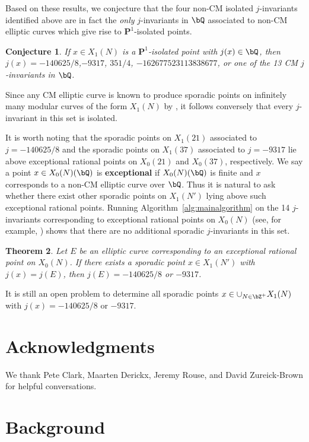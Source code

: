 \documentclass[11pt,reqno]{amsart}
\theoremstyle{plain}
\newtheorem{theorem}{Theorem}%
\newtheorem{conjecture}[theorem]{Conjecture}
\theoremstyle{definition}
\newcommand{\Q}{\bQ}
\newcommand{\Z}{\bZ}
\newcommand{\PP}{\mathbf P}
\begin{document}
Based on these results, we conjecture that the four non-CM isolated $j$-invariants identified above are in fact the \emph{only} $j$-invariants in $\Q$ associated to non-CM elliptic curves which give rise to $\PP^1$-isolated points.

\begin{conjecture}
If $x\in X_1(N)$ is a $\PP^1$-isolated point with $j(x) \in \Q$, then $j(x)=-140625/8$,$-9317$, $351/4$, $-162677523113838677$, or one of the 13 CM $j$-invariants in $\Q$.
\end{conjecture}

\noindent Since any CM elliptic curve is known to produce sporadic points on infinitely many modular curves of the form $X_1(N)$ by \cite[Theorem 7.1]{BELOV}, it follows conversely that every $j$-invariant in this set is isolated.


It is worth noting that the sporadic points on $X_1(21)$ associated to $j=-140625/8$ and the sporadic points on $X_1(37)$ associated to $j=-9317$ lie above exceptional rational points on $X_0(21)$ and $X_0(37)$, respectively. We say a point $x \in X_0(N)(\Q)$ is \textbf{exceptional} if $X_0(N)(\Q)$ is finite and $x$ corresponds to a non-CM elliptic curve over $\Q$. Thus it is natural to ask whether there exist other sporadic points on $X_1(N')$ lying above such exceptional rational points. Running Algorithm~\ref{alg:mainalgorithm} on the 14 $j$-invariants corresponding to exceptional rational points on $X_0(N)$ (see, for example, \cite[Table 4]{LRAnn}) shows that there are no additional sporadic $j$-invariants in this set.
\begin{theorem}
Let $E$ be an elliptic curve corresponding to an exceptional rational point on $X_0(N)$. If there exists a sporadic point $x \in X_1(N')$ with $j(x)=j(E)$, then $j(E) =-140625/8$ or $-9317$.
\end{theorem}

It is still an open problem to determine all sporadic points $x \in \cup_{N \in \Z^+} X_1(N)$ with $j(x) =-140625/8$ or $-9317$.


\section*{Acknowledgments}
We thank Pete Clark, Maarten Derickx, Jeremy Rouse, and David Zureick-Brown for helpful conversations.

\section{Background}
\label{sec:background}
\end{document}
